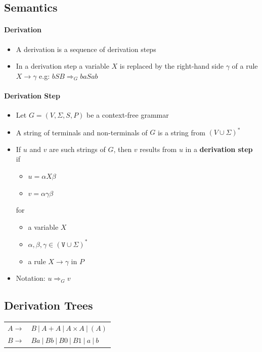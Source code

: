 \documentclass[a3paper, 8pt]{extarticle}
\begin{document}
\begin{multicols*}{6}
 \subsection{Semantics}
 
 \paragraph{Derivation} 
 \begin{itemize}
     \item A derivation is a sequence of derivation steps
     \item In a derivation step a variable $X$ is replaced by the right-hand side $\gamma$ of a rule $X \to \gamma$ e.g: $bSB \Rightarrow_G baSab$
 \end{itemize}

\paragraph{Derivation Step}
\begin{itemize}
    \item Let $G=(V,\Sigma, S, P)$ be a context-free grammar
    \item A string of terminals and non-terminals of $G$ is a string from $(V\cup\Sigma)^*$
    \item If $u$ and $v$ are such strings of $G$, then $v$ results from $u$ in a \textbf{derivation step} if \begin{itemize}
        \item $u = \alpha X\beta$
        \item $v = \alpha \gamma \beta$
    \end{itemize}
    for \begin{itemize}
        \item a variable $X$
        \item $\mathtt{\alpha, \beta, \gamma \in (V \cup \Sigma)^*}$
        \item a rule $X \to \gamma$ in $P$
    \end{itemize}
    \item Notation: \textbf{$u\Rightarrow_G v$}
\end{itemize}

\subsection{Derivation Trees}
\begin{tabular}{l l}
     $A \to$ & $B \ | \ A+A \ | \ A \times A \ | \ (A)$\\ $B \to$ & $Ba \ | \ Bb \ | \ B0 \ | \ B1 \ | \ a \ | \ b$ 
\end{tabular}
    

\end{multicols*}
\end{document}
